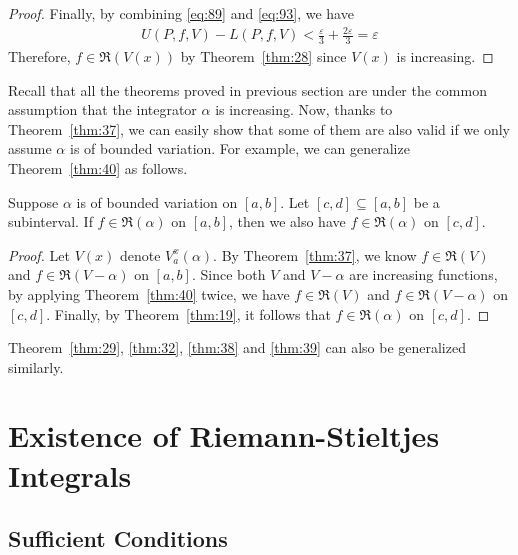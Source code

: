 \documentclass[thmcnt=section, 12pt]{my-elegantbook}
\begin{document}
\begin{proof}
    \par Finally, by combining \eqref{eq:89} and \eqref{eq:93}, we have 
    \begin{align*}
        U(P,f,V) - L(P,f,V)
        < \frac{\varepsilon}{3} + \frac{2\varepsilon}{3}
        = \varepsilon
    \end{align*}
    Therefore, $f \in \mathfrak{R}(V(x))$ by Theorem~\ref{thm:28} since $V(x)$ is increasing.
\end{proof}


Recall that all the theorems proved in previous section
are under the common assumption that the integrator $\alpha$
is increasing.
Now, thanks to Theorem~\ref{thm:37}, 
we can easily show that some of them are also valid 
if we only assume $\alpha$ is of bounded variation.
For example, we can generalize Theorem~\ref{thm:40} as follows.

\begin{theorem} \label{thm:80}
	Suppose $\alpha$ is of bounded variation on $[a, b]$.
	Let $[c, d] \subseteq [a, b]$ be a subinterval.
	If $f \in \mathfrak{R}(\alpha)$ on $[a, b]$, 
	then we also have $f \in \mathfrak{R}(\alpha)$ on $[c, d]$.
\end{theorem}

\begin{proof}
	Let $V(x)$ denote $V_a^x (\alpha)$. By Theorem~\ref{thm:37}, 
	we know $f \in \mathfrak{R}(V)$ 
	and $f \in \mathfrak{R}(V - \alpha)$ on $[a, b]$.
	Since both $V$ and $V - \alpha$ are increasing functions,
	by applying Theorem~\ref{thm:40} twice, 
	we have $f \in \mathfrak{R}(V)$ 
	and $f \in \mathfrak{R}(V - \alpha)$ on $[c, d]$.
	Finally, by Theorem~\ref{thm:19}, 
	it follows that $f \in \mathfrak{R}(\alpha)$ on $[c, d]$.
\end{proof}

Theorem~\ref{thm:29}, \ref{thm:32}, \ref{thm:38} and \ref{thm:39}
can also be generalized similarly.


\section{Existence of Riemann-Stieltjes Integrals}


\subsection{Sufficient Conditions}
\end{document}
